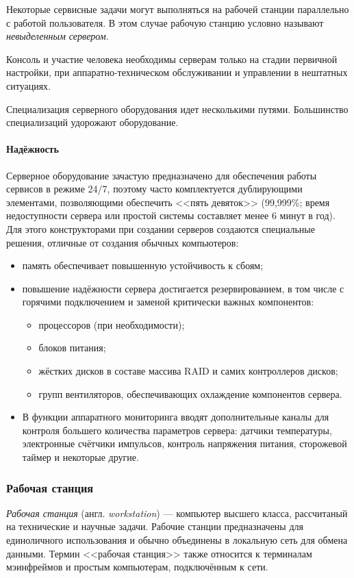 Некоторые сервисные задачи могут выполняться на рабочей станции параллельно с работой пользователя.
В этом случае рабочую станцию условно называют \emph{невыделенным сервером}.

Консоль и участие человека необходимы серверам только на стадии первичной настройки, при аппаратно-техническом обслуживании и управлении в нештатных ситуациях.

Специализация серверного оборудования идет несколькими путями.
Большинство специализаций удорожают оборудование.

\paragraph{Надёжность}
Серверное оборудование зачастую предназначено для обеспечения работы сервисов в режиме 24/7, поэтому часто комплектуется дублирующими элементами, позволяющими обеспечить <<пять девяток>> (99,999\%; время недоступности сервера или простой системы составляет менее 6 минут в год).
Для этого конструкторами при создании серверов создаются специальные решения, отличные от создания обычных компьютеров:
\begin{itemize}
 \item память обеспечивает повышенную устойчивость к сбоям;
 \item повышение надёжности сервера достигается резервированием, в том числе с горячими подключением и заменой критически важных компонентов:
 \begin{itemize}
  \item процессоров (при необходимости);
  \item блоков питания;
  \item жёстких дисков в составе массива RAID и самих контроллеров дисков;
  \item групп вентиляторов, обеспечивающих охлаждение компонентов сервера.
 \end{itemize}
 \item В функции аппаратного мониторинга вводят дополнительные каналы для контроля большего количества параметров сервера: датчики температуры, электронные счётчики импульсов, контроль напряжения питания, сторожевой таймер и некоторые другие.
\end{itemize}

\subsubsection{Рабочая станция}\label{base:introduction:computer:classification:workstation}
\emph{Рабочая станция} (англ. \emph{workstation}) --- компьютер высшего класса, рассчитаный на технические и научные задачи.
Рабочие станции предназначены для единоличного использования и обычно объединены в локальную сеть для обмена данными.
Термин <<рабочая станция>> также относится к терминалам мэинфреймов и простым компьютерам, подключённым к сети.

